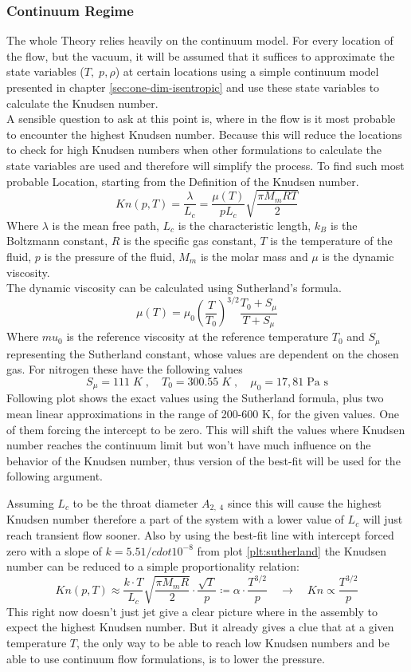 \subsubsection*{Continuum Regime}
	The whole Theory relies heavily on the continuum model.
	For every location of the flow, but the vacuum, it will be assumed that it suffices to approximate the state variables ($T,\; p, \rho$) at certain locations using a simple continuum model presented in chapter \ref{sec:one-dim-isentropic} and use these state variables to calculate the Knudsen number.\\
	A sensible question to ask at this point is, where in the flow is it most probable to encounter the highest Knudsen number.
	Because this will reduce the locations to check for high Knudsen numbers when other formulations to calculate the state variables are used and therefore will simplify the process.
	To find such most probable Location, starting from the Definition of the Knudsen number.
	$$
		Kn(p,T) = \frac{\lambda}{L_c} = \frac{\mu(T)}{pL_c}\sqrt{\frac{\pi M_m R T}{2}}
	$$
	Where $\lambda$ is the mean free path, $L_c$ is the characteristic length, $k_B$ is the Boltzmann constant, $R$ is the specific gas constant, $T$ is the temperature of the fluid, $p$ is the pressure of the fluid, $M_m$ is the molar mass and $\mu$ is the dynamic viscosity.\\
	The dynamic viscosity can be calculated using Sutherland's formula.
	$$
		\mu(T) = \mu_0 \left(\frac{T}{T_0}\right)^{3/2} \frac{T_0 + S_\mu}{T + S_\mu}
	$$
	Where $mu_0$ is the reference viscosity at the reference temperature $T_0$ and $S_\mu$ representing the Sutherland constant, whose values are dependent on the chosen gas. For nitrogen these have the following values \cite{kim2004numericalanalysisflowcharacteristics}
	$$
		S_\mu = 111\;K\;,\quad T_0 = 300.55\;K\;,\quad\mu_0 = 17,81\; \text{Pa s} 
	$$
	Following plot shows the exact values using the Sutherland formula, plus two mean linear approximations in the range of 200-600 K, for the given values.
	One of them forcing the intercept to be zero.
	This will shift the values where Knudsen number reaches the continuum limit but won't have much influence on the behavior of the Knudsen number, thus version of the best-fit will be used for the following argument.
	
	Assuming $L_c$ to be the throat diameter $A_{2,\;4}$ since this will cause the highest Knudsen number therefore a part of the system with a lower value of $L_c$ will just reach transient flow sooner.
	Also by using the best-fit line with intercept forced zero with a slope of $k = 5.51/cdot 10^{-8}$ from plot \ref{plt:sutherland} the Knudsen number can be reduced to a simple proportionality relation:
	$$
		Kn(p,T) \approx
		\frac{ k \cdot T }{ L_c } \sqrt{ \frac{ \pi M_m R}{ 2 } } \cdot \frac{ \sqrt{ T }}{ p }
		\coloneqq \alpha \cdot \frac{ T^{ 3/2 } }{ p }
		\quad \rightarrow \quad
		Kn \propto \frac{ T^{ 3/2 } }{ p }
	$$
	This right now doesn't just jet give a clear picture where in the assembly to expect the highest Knudsen number.
	But it already gives a clue that at a given temperature $T$, the only way to be able to reach low Knudsen numbers and be able to use continuum flow formulations, is to lower the pressure.

